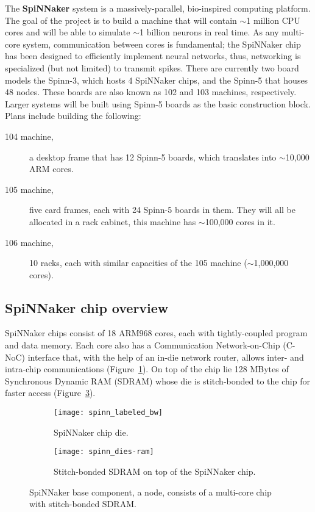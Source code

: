 The \textbf{SpiNNaker} system is a massively-parallel, bio-inspired computing platform. The goal of the project is to build a machine that will contain $\sim$1 million CPU cores and will be able to simulate $\sim$1 billion neurons in real time. As any multi-core system, communication between cores is fundamental; the SpiNNaker chip has been designed to efficiently implement neural networks, thus, networking is specialized (but not limited) to transmit spikes. There are currently two board models the Spinn-3, which hosts 4 SpiNNaker chips, and the Spinn-5 that houses 48 nodes. These boards are also known as 102 and 103 machines, respectively. Larger systems will be built using Spinn-5 boards as the basic construction block. Plans include building the following: 
\begin{description}
  \item[104 machine,] a desktop frame that has 12 Spinn-5 boards, which translates into $\sim$10,000 ARM cores.
  \item[105 machine,] five card frames, each with 24 Spinn-5 boards in them. They will all be allocated in a rack cabinet, this machine has $\sim$100,000 cores in it.
  \item[106 machine,] 10 racks, each with similar capacities of the 105 machine ($\sim$1,000,000 cores).
\end{description}

\subsection{SpiNNaker chip overview}

SpiNNaker chips consist of 18 ARM968 cores, each with tightly-coupled program and data memory. Each core also has a Communication Network-on-Chip (C-NoC) interface that, with the help of an in-die network router, allows inter- and intra-chip communications (Figure~\ref{fig:hw:spinnaker-die}). On top of the chip lie 128 MBytes of Synchronous Dynamic RAM (SDRAM) whose die is stitch-bonded to the chip for faster access (Figure~\ref{fig:hw:bonded-sdram}). 

\begin{figure}[h]
  \begin{center}
    \begin{subfigure}[b]{0.55\textwidth}
      \texttt{[image: spinn\_labeled\_bw]}
      \caption{SpiNNaker chip die.}
      \label{fig:hw:spinnaker-die}
    \end{subfigure}
    \hspace*{0.3cm}
    \begin{subfigure}[b]{0.4\textwidth}
      \texttt{[image: spinn\_dies-ram]}
      \caption{Stitch-bonded SDRAM on top of the SpiNNaker chip.}
      \label{fig:hw:bonded-sdram}
    \end{subfigure}
    \caption{SpiNNaker base component, a node, consists of a multi-core chip with stitch-bonded SDRAM.}
  \end{center}
\end{figure}

